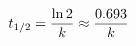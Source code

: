 \documentclass[preview]{standalone}
\begin{document}
\begin{align*}
\special{dvisvgm:raw <g id='unique000'>}t_{1/2} = \frac{\ln 2}{k} \approx \frac{0.693}{k}\special{dvisvgm:raw </g>}
\end{align*}
\end{document}
